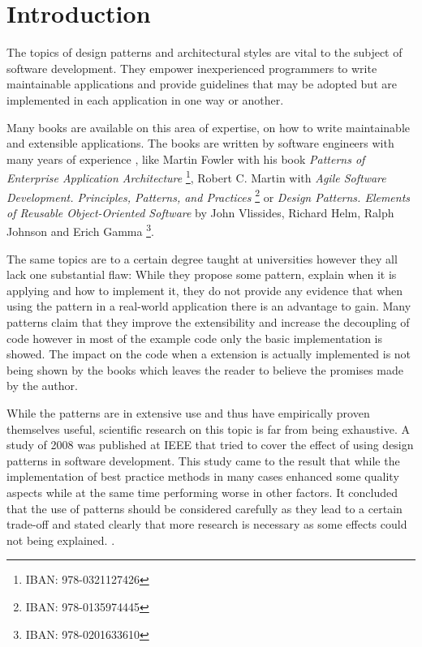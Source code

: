 \chapter{Introduction}

The topics of design patterns and architectural styles are vital to the subject of software development. They empower inexperienced programmers to write maintainable applications and provide guidelines that may be adopted but are implemented in each application in one way or another. 

Many books are available on this area of expertise, on how to write maintainable and extensible applications. The books are written by software engineers with many years of experience , like Martin Fowler with his book \emph{Patterns of Enterprise Application Architecture} \footnote{IBAN: 978-0321127426}, Robert C. Martin with \emph{Agile Software Development. Principles, Patterns, and Practices} \footnote{IBAN: 978-0135974445} or \emph{Design Patterns. Elements of Reusable Object-Oriented Software} by John Vlissides, Richard Helm, Ralph Johnson and Erich Gamma \footnote{IBAN: 978-0201633610}. 

The same topics are to a certain degree taught at universities however they all lack one substantial flaw: While they propose some pattern, explain when it is applying and how to implement it, they do not provide any evidence that when using the pattern in a real-world application there is an advantage to gain.  Many patterns claim that they improve the extensibility and increase the decoupling of code however in most of the example code only the basic implementation is showed. The impact on the code when a extension is actually implemented is not being shown by the books which leaves the reader to believe the promises made by the author. 


While the patterns are in extensive use and thus have empirically proven themselves useful, scientific research on this topic is far from being exhaustive. A study of 2008 was published at IEEE that tried to cover the effect of using design patterns in software development. This study came to the result that while the implementation of best practice methods in many cases enhanced some quality aspects while at the same time performing worse in other factors. It concluded that the use of patterns should be considered carefully as they lead to a certain trade-off and stated clearly that more research is necessary as some effects could not being explained. \cite{quality}.

